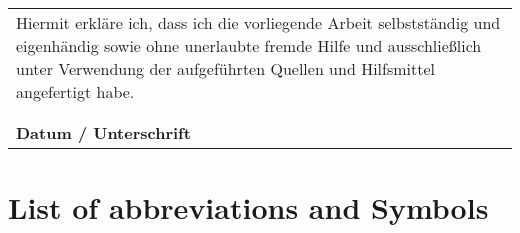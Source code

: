 \documentclass[12pt,a4paper,oneside]{book}
\begin{document}
\pagestyle{plain}




\clearpage
{\pagestyle{empty}\cleardoublepage}%



\begin{minipage}[b][12cm]{\textwidth}
	\begin{center}
		\begin{tabular}{m{12cm}}
			\large{Hiermit erkläre ich, dass ich die vorliegende Arbeit selbstständig und eigenhändig sowie ohne unerlaubte fremde Hilfe und ausschließlich unter Verwendung der aufgeführten Quellen und Hilfsmittel angefertigt habe. }				\\
											\\
											\\
			\midrule
			\textbf{Datum / Unterschrift}	\\
		\end{tabular}
	\end{center}
\end{minipage}

\cleardoublepage
\setlength{\parskip}{3mm}

\onehalfspacing

\cleardoublepage


\singlespacing
\begingroup
\setlength{\parskip}{2mm}
\setcounter{tocdepth}{5}
\tableofcontents
\cleardoublepage
\endgroup

\begingroup
\let\cleardoublepage\relax
\setlength{\parskip}{1mm}
\listoffigures
\clearpage


\listoftables

\vspace{4cm}

\chapter*{List of abbreviations and Symbols}
\begin{acronym}[XXXXX]
\end{acronym}
\end{document}
